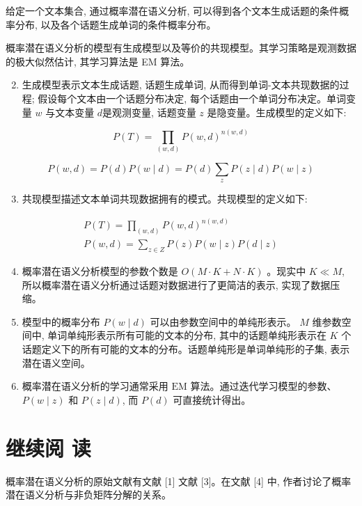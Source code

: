 \documentclass[10pt]{article}
\begin{document}
给定一个文本集合, 通过概率潜在语义分析, 可以得到各个文本生成话题的条件概率分布, 以及各个话题生成单词的条件概率分布。

概率潜在语义分析的模型有生成模型以及等价的共现模型。其学习策略是观测数据的极大似然估计, 其学习算法是 EM 算法。

\begin{enumerate}
  \setcounter{enumi}{1}
  \item 生成模型表示文本生成话题, 话题生成单词, 从而得到单词-文本共现数据的过程; 假设每个文本由一个话题分布决定, 每个话题由一个单词分布决定。单词变量 $w$ 与文本变量 $d$是观测变量, 话题变量 $z$ 是隐变量。生成模型的定义如下:
\end{enumerate}

$$
P(T)=\prod_{(w, d)} P(w, d)^{n(w, d)}
$$

$$
P(w, d)=P(d) P(w \mid d)=P(d) \sum_{z} P(z \mid d) P(w \mid z)
$$

\begin{enumerate}
  \setcounter{enumi}{2}
  \item 共现模型描述文本单词共现数据拥有的模式。共现模型的定义如下:
\end{enumerate}

$$
\begin{gathered}
P(T)=\prod_{(w, d)} P(w, d)^{n(w, d)} \\
P(w, d)=\sum_{z \in Z} P(z) P(w \mid z) P(d \mid z)
\end{gathered}
$$

\begin{enumerate}
  \setcounter{enumi}{3}
  \item 概率潜在语义分析模型的参数个数是 $O(M \cdot K+N \cdot K)$ 。现实中 $K \ll M$, 所以概率潜在语义分析通过话题对数据进行了更简洁的表示, 实现了数据压缩。

  \item 模型中的概率分布 $P(w \mid d)$ 可以由参数空间中的单纯形表示。 $M$ 维参数空间中, 单词单纯形表示所有可能的文本的分布, 其中的话题单纯形表示在 $K$ 个话题定义下的所有可能的文本的分布。话题单纯形是单词单纯形的子集, 表示潜在语义空间。

  \item 概率潜在语义分析的学习通常采用 $\mathrm{EM}$ 算法。通过迭代学习模型的参数、 $P(w \mid z)$ 和 $P(z \mid d)$, 而 $P(d)$ 可直接统计得出。

\end{enumerate}

\section*{继续阅 读}
概率潜在语义分析的原始文献有文献 [1] 文献 [3]。在文献 [4] 中, 作者讨论了概率潜在语义分析与非负矩阵分解的关系。
\end{document}
